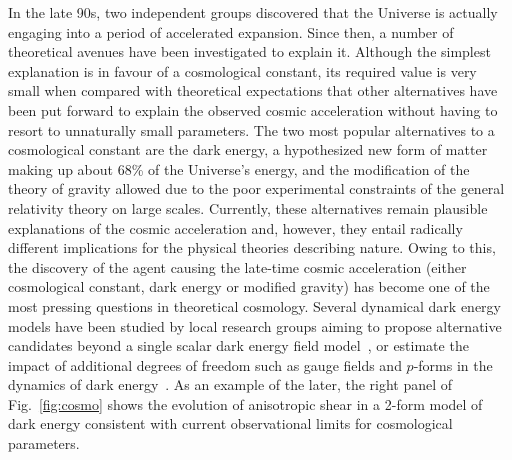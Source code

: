 \documentclass[a4paper,11pt]{article}
\begin{document}
\begin{enumerate}
In the late 90s, two independent groups discovered that the Universe is actually engaging into a period of accelerated expansion. Since then, a number of theoretical avenues have been investigated to explain it. Although the simplest explanation is in favour of a cosmological constant, its required value is very small when compared with theoretical expectations that other alternatives have been put forward to explain the observed cosmic acceleration without having to resort to unnaturally small parameters. The two most popular alternatives to a cosmological constant are the dark energy, a hypothesized new form of matter making up about 68\% of the Universe's energy, and the modification of the theory of gravity allowed due to the poor experimental constraints of the general relativity theory on large scales. Currently, these alternatives remain plausible explanations of the cosmic acceleration and, however, they entail radically different implications for the physical theories describing nature. Owing to this, the discovery of the agent causing the late-time cosmic acceleration (either cosmological constant, dark energy or modified gravity) has become one of the most pressing questions in theoretical cosmology. Several dynamical dark energy models have been studied by local research groups aiming to propose alternative candidates beyond a single scalar dark energy field model~\cite{Rodriguez:2017wkg, Alvarez:2019ues, Almeida:2020lsn, Gomez:2020sfz, Orjuela-Quintana:2020klr, Guarnizo:2020pkj}, or estimate the impact of additional degrees of freedom such as gauge fields and $p$-forms in the dynamics of dark energy~\cite{Almeida:2018fwe, Almeida:2019iqp}. As an example of the later, the right panel of Fig.~\ref{fig:cosmo}  shows the evolution of anisotropic shear in a 2-form model of dark energy consistent with current observational limits for cosmological parameters.   
%
\end{enumerate}
\end{document}
